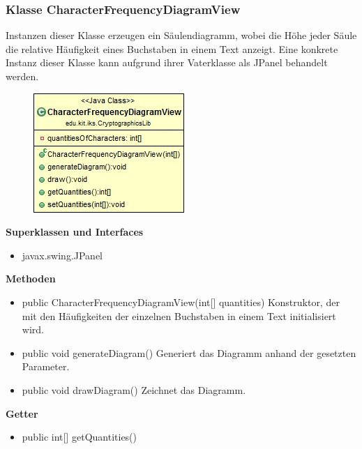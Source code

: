 \documentclass{article}
\begin{document}
	\subsubsection{Klasse CharacterFrequencyDiagramView}
	  Instanzen dieser Klasse erzeugen ein Säulendiagramm, wobei die
	  Höhe jeder Säule die relative Häufigkeit eines Buchstaben in einem Text anzeigt.
	  Eine konkrete Instanz dieser Klasse kann aufgrund ihrer Vaterklasse als JPanel behandelt werden.
	
      \begin{figure}[H]
        \centering
        \includegraphics{resources/edu-kit-iks-CryptographicsLib-CharacterFrequencyDiagramView}
      \end{figure}
	
      \textbf{Superklassen und Interfaces}
      \begin{itemize}
        \item javax.swing.JPanel
      \end{itemize}
	
      \textbf{Methoden}
      \begin{itemize}
        \item public CharacterFrequencyDiagramView(int[] quantities) \newline
          Konstruktor, der mit den Häufigkeiten der einzelnen Buchstaben in einem Text
          initialisiert wird.
        \item public void generateDiagram() \newline
          Generiert das Diagramm anhand der gesetzten Parameter.
        \item public void drawDiagram() \newline
          Zeichnet das Diagramm.
      \end{itemize}
      
      \textbf{Getter}
      \begin{itemize}
		\item public int[] getQuantities()
      \end{itemize}
      
\end{document}
